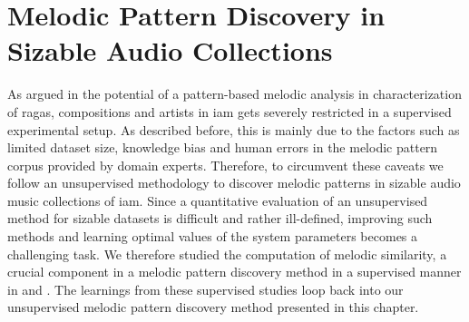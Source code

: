 

\section{Melodic Pattern Discovery in Sizable Audio Collections}
\label{sec:patterns_melodic_pattern_discovery}

As argued in  the potential of a pattern-based melodic analysis in characterization of \glspl{raga}, compositions and artists  in \gls{iam} gets severely restricted in a supervised experimental setup. As described before, this is mainly due to the factors such as limited dataset size, knowledge bias and human errors in the melodic pattern corpus provided by domain experts. Therefore, to circumvent these caveats we follow an unsupervised methodology to discover melodic patterns in sizable audio music collections of \gls{iam}. Since a quantitative evaluation of an unsupervised method for sizable datasets is difficult and rather ill-defined, improving such methods and learning optimal values of the system parameters becomes a challenging task. We therefore studied the computation of melodic similarity, a crucial component in a melodic pattern discovery method in a supervised manner in  and . The learnings from these supervised studies loop back into our unsupervised melodic pattern discovery method presented in this chapter. 

